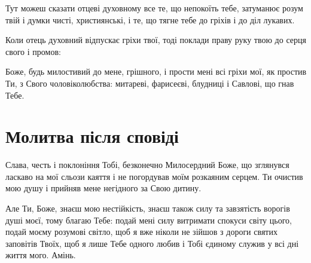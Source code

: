 \documentclass[chapters.tex]{subfiles}
\begin{document}
Тут можеш сказати отцеві духовному все те, що непокоїть тебе, затуманює розум твій і думки чисті, християнські, і те, що тягне тебе до гріхів і до діл лукавих.

Коли отець духовний відпускає гріхи твої, тоді поклади праву руку твою до серця свого і промов:

Боже, будь милостивий до мене, грішного, і прости мені всі гріхи мої, як простив Ти, з Свого чоловіколюбства: митареві, фарисеєві, блудниці і Савлові, що гнав Тебе.

\section{Молитва після сповіді}
Слава, честь і поклоніння Тобі, безконечно Милосердний Боже, що зглянувся ласкаво на мої сльози каяття і не погордував моїм розкаяним серцем. Ти очистив мою душу і прийняв мене негідного за Свою дитину.

Але Ти, Боже, знаєш мою нестійкість, знаєш також силу та завзятість ворогів душі моєї, тому благаю Тебе: подай мені силу витримати спокуси світу цього, подай моєму розумові світло, щоб я вже ніколи не зійшов з дороги святих заповітів Твоїх, щоб я лише Тебе одного любив і Тобі єдиному служив у всі дні життя мого. Амінь.
\end{document}

